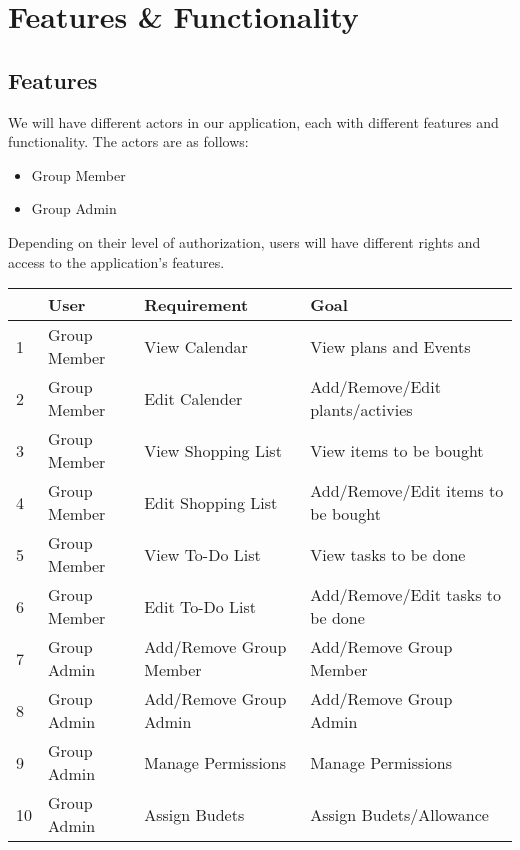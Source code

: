 \documentclass[12pt]{article}
\begin{document}
\pagebreak
\section{Features \& Functionality}

\subsection{Features}

We will have different actors in our application, each with different features and functionality. The actors are as follows:

\begin{itemize}
    \item Group Member
    \item Group Admin
\end{itemize}

Depending on their level of authorization, users will have different rights and access to the application's features. 

\setlength{\tabcolsep}{3pt}

\begin{table}[h]
    \small
    \begin{tabularx}{\textwidth}{|p{12pt}|p{85pt}|X|X|}
        \hline  & User & Requirement & Goal \\
        \hline 1 & Group Member & View Calendar & View plans and Events \\
        \hline 2 & Group Member & Edit Calender & Add/Remove/Edit plants/activies \\
        \hline 3 & Group Member & View Shopping List & View items to be bought \\
        \hline 4 & Group Member & Edit Shopping List & Add/Remove/Edit items to be bought \\
        \hline 5 & Group Member & View To-Do List & View tasks to be done \\
        \hline 6 & Group Member & Edit To-Do List & Add/Remove/Edit tasks to be done \\
        \hline 7 & Group Admin & Add/Remove Group Member & Add/Remove Group Member \\
        \hline 8 & Group Admin & Add/Remove Group Admin & Add/Remove Group Admin \\
        \hline 9 & Group Admin & Manage Permissions & Manage Permissions \\
        \hline 10 & Group Admin & Assign Budets & Assign Budets/Allowance \\
        \hline 
    \end{tabularx}
\end{table}
\end{document}
